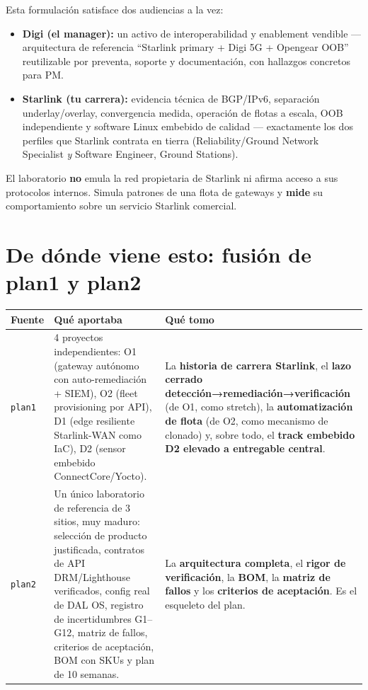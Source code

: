 \documentclass[11pt,a4paper]{article}
\newcommand{\hcell}[1]{\textbf{#1}}
\begin{document}
Esta formulación satisface dos audiencias a la vez:

\begin{itemize}
  \item \textbf{Digi (el manager):} un activo de interoperabilidad y enablement vendible — arquitectura de referencia ``Starlink primary + Digi 5G + Opengear OOB'' reutilizable por preventa, soporte y documentación, con hallazgos concretos para PM.
  \item \textbf{Starlink (tu carrera):} evidencia técnica de BGP/IPv6, separación underlay/overlay, convergencia medida, operación de flotas a escala, OOB independiente y software Linux embebido de calidad — exactamente los dos perfiles que Starlink contrata en tierra (Reliability/Ground Network Specialist \emph{y} Software Engineer, Ground Stations).
\end{itemize}

El laboratorio \textbf{no} emula la red propietaria de Starlink ni afirma acceso a sus protocolos internos. Simula patrones de una flota de gateways y \textbf{mide} su comportamiento sobre un servicio Starlink comercial.

\section{De dónde viene esto: fusión de plan1 y plan2}

\begin{center}
\small
\begin{tabularx}{\textwidth}{@{}p{1.7cm} X X@{}}
\toprule
\hcell{Fuente} & \hcell{Qué aportaba} & \hcell{Qué tomo} \\
\midrule
\texttt{plan1} & 4 proyectos independientes: O1 (gateway autónomo con auto-remediación + SIEM), O2 (fleet provisioning por API), D1 (edge resiliente Starlink-WAN como IaC), D2 (sensor embebido ConnectCore/Yocto). & La \textbf{historia de carrera Starlink}, el \textbf{lazo cerrado detección→remediación→verificación} (de O1, como stretch), la \textbf{automatización de flota} (de O2, como mecanismo de clonado) y, sobre todo, el \textbf{track embebido D2 elevado a entregable central}. \\
\addlinespace
\texttt{plan2} & Un único laboratorio de referencia de 3 sitios, muy maduro: selección de producto justificada, contratos de API DRM/Lighthouse verificados, config real de DAL OS, registro de incertidumbres G1–G12, matriz de fallos, criterios de aceptación, BOM con SKUs y plan de 10 semanas. & La \textbf{arquitectura completa}, el \textbf{rigor de verificación}, la \textbf{BOM}, la \textbf{matriz de fallos} y los \textbf{criterios de aceptación}. Es el esqueleto del plan. \\
\bottomrule
\end{tabularx}
\end{center}
\end{document}
